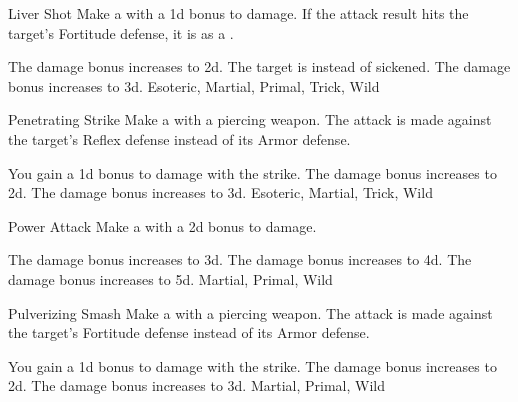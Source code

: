\lowercase{\hypertarget{maneuver:Liver Shot}{}}\label{maneuver:Liver Shot}
\begin{apability}{\hypertarget{maneuver:Liver Shot}{Liver Shot}}
Make a  with a \plus1d bonus to damage.
If the attack result hits the target's Fortitude defense,
it is  as a .

\rankline
{} The damage bonus increases to \plus2d.
 The target is  instead of sickened.
 The damage bonus increases to \plus3d.
 Esoteric, Martial, Primal, Trick, Wild
\end{apability}
\vspace{0.25em}



\lowercase{\hypertarget{maneuver:Penetrating Strike}{}}\label{maneuver:Penetrating Strike}
\begin{apability}{\hypertarget{maneuver:Penetrating Strike}{Penetrating Strike}}
Make a  with a piercing weapon.
The attack is made against the target's Reflex defense instead of its Armor defense.

\rankline
{} You gain a \plus1d bonus to damage with the strike.
 The damage bonus increases to \plus2d.
 The damage bonus increases to \plus3d.
 Esoteric, Martial, Trick, Wild
\end{apability}
\vspace{0.25em}



\lowercase{\hypertarget{maneuver:Power Attack}{}}\label{maneuver:Power Attack}
\begin{apability}{\hypertarget{maneuver:Power Attack}{Power Attack}}
Make a  with a \plus2d bonus to damage.

\rankline
{} The damage bonus increases to \plus3d.
 The damage bonus increases to \plus4d.
 The damage bonus increases to \plus5d.
 Martial, Primal, Wild
\end{apability}
\vspace{0.25em}



\lowercase{\hypertarget{maneuver:Pulverizing Smash}{}}\label{maneuver:Pulverizing Smash}
\begin{apability}{\hypertarget{maneuver:Pulverizing Smash}{Pulverizing Smash}}
Make a  with a piercing weapon.
The attack is made against the target's Fortitude defense instead of its Armor defense.

\rankline
{} You gain a \plus1d bonus to damage with the strike.
 The damage bonus increases to \plus2d.
 The damage bonus increases to \plus3d.
 Martial, Primal, Wild
\end{apability}
\vspace{0.25em}



